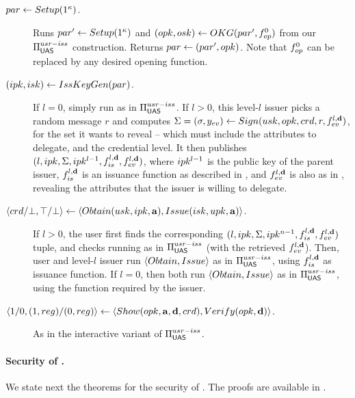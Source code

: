 \begin{description}
\item[$par \gets Setup(1^\kappa)$.]  Runs $par' \gets Setup(1^\kappa)$
  and $(opk,osk) \gets OKG(par',f_{op}^0)$ from our
  $\Pi_{\mathsf{UAS}}^{usr-iss}$ construction. Returns $par \gets (par',opk)$. Note
  that $f_{op}^0$ can be replaced by any desired opening function.
\item[$(ipk,isk) \gets IssKeyGen(par)$.] If $l=0$, simply run \IKeyGen as
  in $\Pi_{\mathsf{UAS}}^{usr-iss}$. If $l>0$, this level-$l$ issuer picks a random
  message $r$ and computes $\Sigma = (\sigma,y_{ev}) \gets Sign(usk,opk,crd,r,
  f_{ev}^{l,\mathbf{d}})$, for the \dattrs set it wants to reveal -- which must
  include the attributes to delegate, and the credential level. It then
  publishes $(l,ipk,\Sigma,ipk^{l-1},f_{is}^{l,\mathbf{d}},f_{ev}^{l,\mathbf{d}})$,
  where $ipk^{l-1}$ is the public key of the parent issuer,
  $f_{is}^{l,\mathbf{d}}$ is an issuance function as described in
  , and $f_{ev}^{l,\mathbf{d}}$ is also as in
  , revealing the attributes that the issuer is
  willing to delegate.
\item[$\langle crd/\bot,\top/\bot \rangle \gets
  \langle Obtain(usk,ipk,\mathbf{a}),Issue(isk,upk,\mathbf{a}) \rangle$.]
  If $l>0$, the user first finds the corresponding $(l,ipk,\Sigma,ipk^{n-1},
  f_{is}^{l,\mathbf{d}},f_{ev}^{l,\mathbf{d}})$ tuple, and checks \Sig running
  \Verify as in $\Pi_{\mathsf{UAS}}^{usr-iss}$ (with the retrieved $f_{ev}^{l,\mathbf{d}}$).
  Then, user and level-$l$ issuer run $\langle Obtain,Issue\rangle$ as in
  $\Pi_{\mathsf{UAS}}^{usr-iss}$, using $f_{is}^{l,\mathbf{d}}$ as issuance function. If
  $l=0$, then both run $\langle Obtain,Issue\rangle$ as in
  $\Pi_{\mathsf{UAS}}^{usr-iss}$, using the \fissue function required by the issuer.
\item[$\langle 1/0,(1,reg)/(0,reg)\rangle
  \gets \langle Show(opk,\mathbf{a},\mathbf{d},crd),
  Verify(opk,\mathbf{d}) \rangle$.] As in the interactive variant of
  $\Pi_{\mathsf{UAS}}^{usr-iss}$.  
\end{description}

\paragraph{Security of \CUASDAC.} %
We state next the theorems for the security of \CUASDAC. The proofs are
available in .

